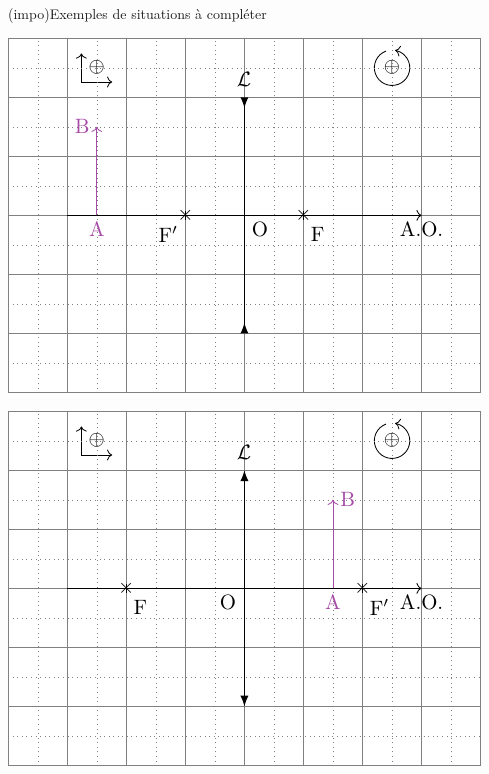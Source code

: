 \documentclass[../../main/main.tex]{subfiles}
\begin{document}
\begin{tcb}[label=impo:cons_exem](impo){Exemples de situations à compléter}
	\begin{minipage}{0.50\linewidth}
		\begin{center}
			\includegraphics[width=\linewidth]{lent_div-constru_simple-plain}
			\label{fig:divconstrusimple}
		\end{center}
	\end{minipage}
	\hfill
	\begin{minipage}{0.50\linewidth}
		\begin{center}
			\includegraphics[width=\linewidth]{lent_conv-constru_after-plain}

\end{center}
\end{minipage}
\end{tcb}
\end{document}
